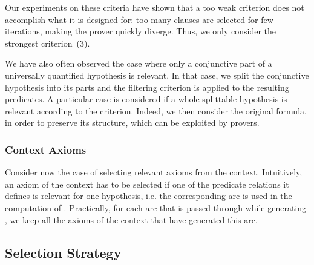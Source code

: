 \documentclass{acm_proc_article-sp}
\theoremstyle{nonumberplain}
\begin{document}
Our experiments on these criteria have shown that a too weak criterion
does not accomplish what it is designed for: too many clauses  are
selected for few iterations, making the prover quickly diverge. Thus,
we only consider the strongest criterion~(3).

We have also often observed the case where only a conjunctive part of a
universally quantified hypothesis is relevant. In that case, we split
the conjunctive hypothesis into its parts and the filtering criterion
is applied to the resulting predicates. A particular case is considered
if a whole splittable hypothesis is relevant according to the
criterion. Indeed, we then consider the original formula, in order to
preserve its structure, which can be exploited by provers.



\subsubsection{Context Axioms}
Consider now the case of selecting relevant axioms from the context.
Intuitively, an axiom of the context has to be selected if 
one of the predicate relations it defines is relevant for one
hypothesis, i.e. the corresponding arc is used in the computation of . 
Practically, for each arc that is passed through while generating
, we keep all the axioms of the context that have generated 
this arc.



\subsection{Selection Strategy}
\label{select:algo:ssec}
\end{document}
